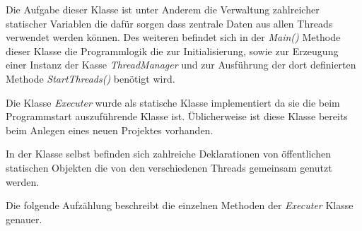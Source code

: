 Die Aufgabe dieser Klasse ist unter Anderem die Verwaltung zahlreicher statischer Variablen die dafür sorgen dass zentrale Daten aus allen Threads verwendet werden können.
Des weiteren befindet sich in der \textit{Main()} Methode dieser Klasse die Programmlogik die zur Initialisierung, sowie zur Erzeugung einer Instanz der Kasse \textit{ThreadManager} und zur Ausführung der dort definierten Methode \textit{StartThreads()} benötigt wird.

Die Klasse \textit{Executer} wurde als statische Klasse implementiert da sie die beim Programmstart auszuführende Klasse ist. Üblicherweise ist diese Klasse bereits beim Anlegen eines neuen Projektes vorhanden.

In der Klasse selbst befinden sich zahlreiche Deklarationen von öffentlichen statischen Objekten die von den verschiedenen Threads gemeinsam genutzt werden.

Die folgende Aufzählung beschreibt die einzelnen Methoden der \textit{Executer} Klasse genauer.

